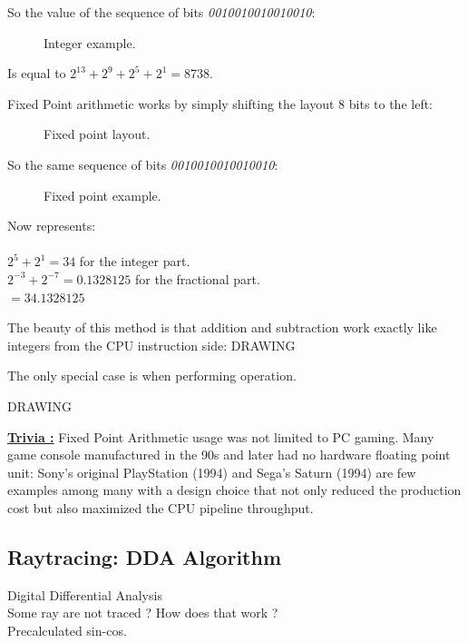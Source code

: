 \documentclass[book.tex]{subfiles}
\begin{document}
So the value of the sequence of bits \emph{0010010010010010}:
\begin{figure}[H]
\centering

 \caption{Integer example.} \label{fig:mips}
 \end{figure}

 Is equal to $ 2^{13} + 2^9 + 2^5 + 2^1 =  8738 $.

\bigskip


Fixed Point arithmetic works by simply shifting the layout 8 bits to the left:
\begin{figure}[H]
 \centering
  
 \caption{Fixed point layout.} \label{fig:mips}
\end{figure}

So the same sequence of bits \emph{0010010010010010}:
\begin{figure}[H]
 \centering
   
  \caption{Fixed point example.} \label{fig:mips}
\end{figure} 

Now represents:\\
\\
$ 2^5 + 2^1 = 34 $ for the integer part.\\
$ 2^{-3}+2^{-7} = 0.1328125 $ for the fractional part.\\
$ = 34.1328125$\\

\bigskip

The beauty of this method is that addition and subtraction work exactly like integers from the CPU instruction side:
  \bigskip
  DRAWING
  \bigskip


 The only special case is when performing operation.

\bigskip
  DRAWING
  \bigskip



 \textbf{\underline{Trivia :}}  Fixed Point Arithmetic usage was not limited to PC gaming. Many game console manufactured in the 90s and later had no hardware floating point unit: Sony's original PlayStation (1994) and Sega's Saturn (1994) are few examples among many with a design choice that not only reduced the production cost but also maximized the CPU pipeline throughput.
 
 
 
 
 
 
 
 
 
 
 
 
 
\subsection{Raytracing: DDA Algorithm}
Digital Differential Analysis\\
Some ray are not traced ? How does that work ?\\
Precalculated sin-cos.\\
\end{document}
